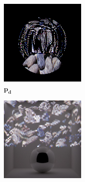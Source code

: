 \begin{figure}[]
\begin{subfigure}{\textwidth}
        \begin{subfigure}{0.32\textwidth}
            \centering
            \includegraphics[width=\textwidth]{images/04-experiment03/dof/defocused.jpg}
            \caption*{\(\bm{p_d}\)}
        \end{subfigure}
        \hfill
        \begin{subfigure}{0.32\textwidth}
            \centering
            \includegraphics[width=\textwidth]{images/04-experiment03/dof/defocused_on_normal.jpg}

\end{subfigure}
\end{subfigure}
\end{figure}
